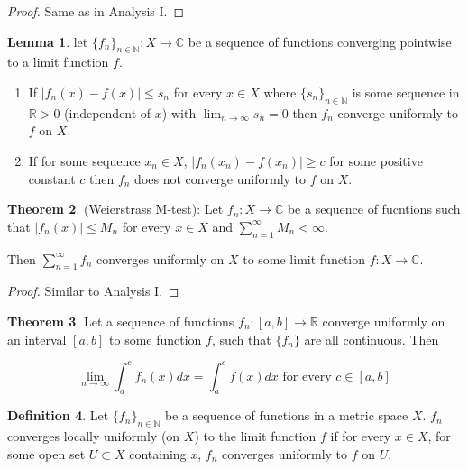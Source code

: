 \documentclass[12pt,a4paper]{article}
\theoremstyle{definition}
\newtheorem{definition}{Definition}[subsection]
\newtheorem{theorem}[definition]{Theorem}
\newtheorem{lemma}[definition]{Lemma}
\begin{document}
\begin{proof}
	Same as in Analysis I.
\end{proof}

\begin{lemma}
	let ${\{f_n\}}_{n \in \mathbb{N}}: X \rightarrow \mathbb{C}$ be a sequence of functions converging pointwise to a limit function $f$.

	\begin{enumerate}
		\item If $|f_n(x) - f(x)| \le s_n$ for every $x \in X$ where ${\{s_n\}}_{n \in \mathbb{N}}$ is some sequence in $\mathbb{R} > 0$ (independent of $x$) with $\lim_{n \rightarrow \infty} s_n = 0$ then $f_n$ converge uniformly to $f$ on $X$.
		\item If for some sequence $x_n \in X$, $|f_n(x_n) - f(x_n)| \ge c$ for some positive constant $c$ then $f_n$ does not converge uniformly to $f$ on $X$.
	\end{enumerate}
\end{lemma}

\begin{theorem}
	(Weierstrass M-test): Let $f_n: X \rightarrow \mathbb{C}$ be a sequence of fucntions such that $|f_n(x)| \le M_n$ for every $x \in X$ and $\sum_{n = 1}^{\infty} M_n < \infty$.

	Then $\sum_{n = 1}^{\infty} f_n$ converges uniformly on $X$ to some limit function $f: X \rightarrow \mathbb{C}$.
\end{theorem}

\begin{proof}
	Similar to Analysis I.
\end{proof}

\begin{theorem}
	Let a sequence of functions $f_n: [a, b] \rightarrow \mathbb{R}$ converge uniformly on an interval $[a, b]$ to some function $f$, such that $\{f_n\}$ are all continuous. Then

	\[\lim_{n \rightarrow \infty} \int_a^c f_n(x) dx = \int_a^c f(x) dx \text{ for every } c \in [a, b]\]
\end{theorem}

\begin{definition}
	Let ${\{f_n\}}_{n \in \mathbb{N}}$ be a sequence of functions in a metric space $X$. $f_n$ converges locally uniformly (on $X$) to the limit function $f$ if for every $x \in X$, for some open set $U \subset X$ containing $x$, $f_n$ converges uniformly to $f$ on $U$.
\end{definition}
\end{document}
